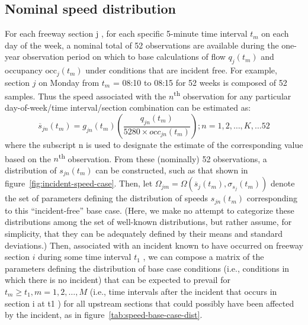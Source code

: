 \documentclass[12pt]{report}
\newcounter{time}
\begin{document}
\subsection{Nominal speed distribution}
\label{sec:nom-speed-dist}
For each freeway section j , for each specific 5-minute time interval
$t_m$ on each day of the week, a nominal total of 52 observations are
available during the one-year observation period on which to base
calculations of flow $q_j(t_m)$ and occupancy $\mathrm{occ}_j(t_m)$
under conditions that are incident free. For example, section $j$ on
Monday from $t_m$ = 08:10 to 08:15 for 52 weeks is composed of 52
samples. Thus the speed associated with the $n$\textsuperscript{th}
observation for any particular day-of-week/time interval/section
combination can be estimated as:
\begin{equation}
  \label{eq:nominal-speed-obs}
  \overline{s}_{jn}(t_m) = g_{jn}(t_m)\left(\frac{q_{jn}(t_m)}{5280\times occ_{jn}(t_m)}\right);n=1,2,\ldots,K,\ldots{52}
\end{equation}
where the subscript n is used to designate the estimate of the
corresponding value based on the $n$\textsuperscript{th}
observation. From these (nominally) 52 observations, a distribution of
$s_{jn}(t_m)$ can be constructed, such as that shown in
figure~\ref{fig:incident-speed-case}.  Then, let $\Omega_{jm} =
\Omega\left(\overline{s}_j(t_m),\sigma_{s_j}(t_m)\right)$ denote the
set of parameters defining the distribution of speeds $s_{jn}(t_m)$
corresponding to this ``incident-free'' base case. (Here, we make no
attempt to categorize these distributions among the set of well-known
distributions, but rather assume, for simplicity, that they can be
adequately defined by their means and standard deviations.)  Then,
associated with an incident known to have occurred on freeway section
$i$ during some time interval $t_1$ , we can compose a matrix of the
parameters defining the distribution of base case conditions (i.e.,
conditions in which there is no incident) that can be expected to
prevail for $t_m \ge t_1, m = 1, 2, \ldots{}, M$ (i.e., time intervals
after the incident that occurs in section i at t1 ) for all upstream
sections that could possibly have been affected by the incident, as in
figure~\ref{tab:speed-base-case-dist}.
\end{document}
